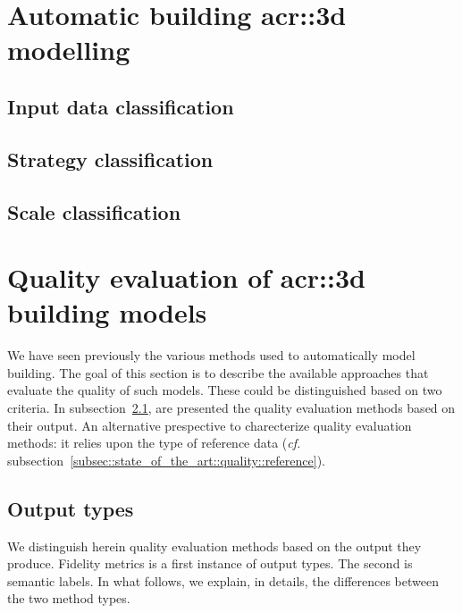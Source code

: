 \minitoc

\vfill

\clearpage

\section{Automatic building \gls*{acr::3d} modelling}
    \label{sec::state_of_the_art::building_modeling}

    \subsection{Input data classification}
        \label{subsec::state_of_the_art::building_modeling::input}

    \subsection{Strategy classification}
        \label{subsec::state_of_the_art::building_modeling::strategy}

    \subsection{Scale classification}
        \label{subsec::state_of_the_art::building_modeling::scale}

    \clearpage
\section{Quality evaluation of \gls*{acr::3d} building models}
    \label{sec::state_of_the_art::quality}
    We have seen previously the various methods used to automatically model building.
    The goal of this section is to describe the available approaches that evaluate the quality of such models.
    These could be distinguished based on two criteria.
    In subsection~\ref{subsec::state_of_the_art::quality::output}, are presented the quality evaluation methods based on their output.
    An alternative prespective to charecterize quality evaluation methods: it relies upon the type of reference data (\textit{cf.} subsection~\ref{subsec::state_of_the_art::quality::reference}).

    \subsection{Output types}
        \label{subsec::state_of_the_art::quality::output}
        We distinguish herein quality evaluation methods based on the output they produce.
        Fidelity metrics is a first instance of output types.
        The second is semantic labels.
        In what follows, we explain, in details, the differences between the two method types.


